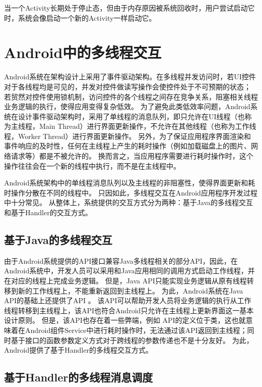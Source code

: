 当一个Activity长期处于停止态，但由于内存原因被系统回收时，用户尝试启动它时，系统会像启动一个新的Activity一样启动它。

\section{Android中的多线程交互}
Android系统在架构设计上采用了事件驱动架构。在多线程并发访问时，若UI控件对于各线程均是可见的，并发对控件做读写操作会使控件处于不可预期的状态；
若贸然对控件使用锁机制，访问控件的各个线程之间存在竞争关系，阻塞相关线程业务逻辑的执行，使得应用变得复杂低效。
为了避免此类低效率问题，Android系统在设计事件驱动架构时，采用了单线程的消息队列，即只允许在UI线程（也称为主线程，Main Thread）进行界面更新操作，不允许在其他线程（也称为工作线程，Worker Thread）进行界面更新操作。
另外，为了保证应用程序界面渲染和事件响应的及时性，任何在主线程上产生的耗时操作（例如加载磁盘上的图片、网络请求等）都是不被允许的。
换而言之，当应用程序需要进行耗时操作时，这个操作往往会在一个新的线程中执行，而不是在主线程中。


Android系统架构中的单线程消息队列以及主线程的非阻塞性，使得界面更新和耗时操作分散在不同的线程中。
只因如此，多线程交互在Android应用程序开发过程中十分常见。
从整体上，系统提供的交互方式分为两种：基于Java的多线程交互和基于Handler的交互方式\cite{androidSourceCode}。

\subsection{基于Java的多线程交互}

由于Android系统提供的API接口兼容Java多线程相关的部分API，因此，在Android系统中，开发人员可以采用和Java应用相同的调用方式启动工作线程，并在对应的线程上完成业务逻辑。
但是，Java API只能实现业务逻辑从原有线程转移到新的工作线程上，不能重新返回到主线程上。
为此，Android系统在Java API的基础上还提供了API 。
该API可以帮助开发人员将业务逻辑的执行从工作线程转移到主线程上，该API也符合Android只允许在主线程上更新界面这一基本设计原则。
但是，该API也存在着一些弊端，例如 API的定义位于类，这也就意味着在Android组件Service中进行耗时操作时，无法通过该API返回到主线程；同时基于接口的函数参数定义方式对于跨线程的参数传递也不是十分友好。
为此，Android提供了基于Handler的多线程交互方式。

\subsection{基于Handler的多线程消息调度}

